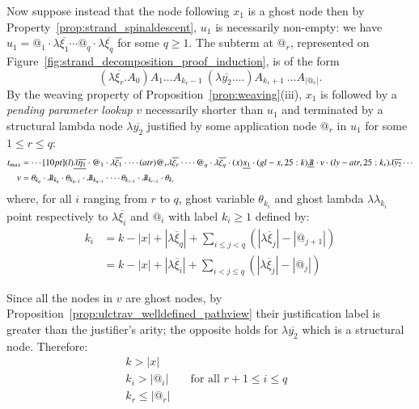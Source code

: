 \documentclass{elsarticle}
\theoremstyle{plain}
\theoremstyle{definition}
\newcommand{\ghostlmd}{{\lambda\!\!\lambda}}
\newcommand{\ghostvar}{\theta}
\begin{document}
\begin{enumerate}
Now suppose instead that the node following $x_1$ is a ghost node then by Property~\ref{prop:strand_spinaldescent}, $u_1$ is necessarily non-empty: we have $u_1 =
@_1 \cdot\lambda\overline{\xi_1} \cdots @_q\cdot \lambda\overline{\xi_q}$ for some $q\geq 1$. The subterm at $@_r$,  represented on Figure~\ref{fig:strand_decomposition_proof_induction}, is of the form
$$(\lambda\overline{\xi_r}. A_0) A_1 \ldots A_{k_{r}-1}\ (\lambda\overline{y_2}. \ldots)A_{k_{r}+1}\ \ldots A_{|@_r|} .$$
By the weaving property of Proposition~\ref{prop:weaving}(iii), $x_1$ is followed by a \emph{pending parameter lookup} $v$ necessarily shorter than $u_1$ and terminated by a structural lambda node $\lambda\overline{y_2}$ justified by some application node $@_r$ in $u_1$ for some $1\leq r \leq q$:
\begin{align*}
 t_{max} &= \cdots \Pstr[10pt]{
(l){\underline{\lambda\overline{\eta_1}}} \cdot
{@_1} \cdot \lambda\overline{\xi_1} \cdot
\cdots
(atr){@_r} \lambda\overline{\xi_r} \cdot
\cdots
{@_q} \cdot\lambda\overline{\xi_q} \cdot
(x){\underline{x_1}}\cdot
(gl-x,25:k){\underline\ghostlmd}
\cdot v
\cdot
(ly-atr,25:k_r){\lambda\overline{y_2}}
\cdots
 } \\
v &= \ghostvar_{k_q} \cdot \ghostlmd_{k_q} \cdot
\ghostvar_{k_{q-1}} \cdot \ghostlmd_{k_{q-1}} \cdot
\cdots
\ghostvar_{k_{r-1}} \cdot \ghostlmd_{k_{r-1}} \cdot
\ghostvar_{k_{r}}
\end{align*}
where, for all $i$ ranging from $r$ to $q$, ghost variable
$\ghostvar_{k_i}$ and ghost lambda $\ghostlmd_{k_i}$ point respectively to $\lambda\overline{\xi_i}$ and $@_i$ with label $k_i\geq1$ defined by:
\begin{align*}
  k_i &= k - |x| + |\lambda\overline{\xi}_q| + \sum_{i\leq j < q} (|\lambda\overline{\xi}_{j}| - |@_{j+1}|)
\\
   &= k - |x| +
  |\lambda\overline{\xi}_{i}| +
  \sum_{i< j\leq q} (|\lambda\overline{\xi}_j| - |@_j|)
\end{align*}

Since all the nodes in $v$ are ghost nodes, by Proposition~\ref{prop:ulctrav_welldefined_pathview} their justification label is greater than the justifier's arity; the opposite holds for $\lambda\overline{y_2}$ which is a structural node. Therefore:
\begin{align}
k > |x| \label{eqn:k_greater_than_x} \\
k_i > |@_i| & \quad\mbox{for all $r+1\leq i \leq q$ } \label{eqn:qnfdecomp_kj}\\
k_r \leq |@_r|
\end{align}



\end{enumerate}
\end{document}

